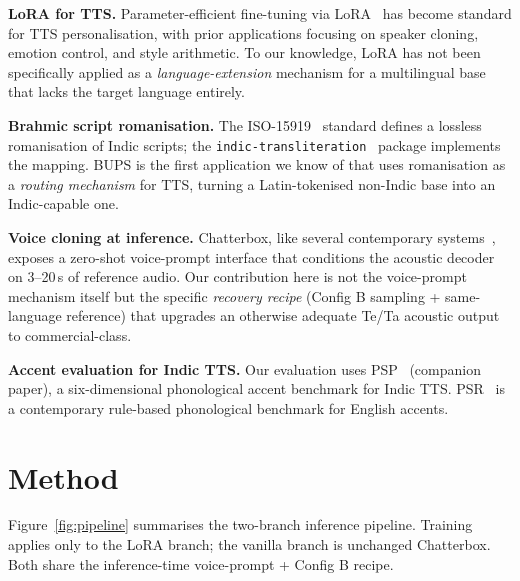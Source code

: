 \documentclass[conference,a4paper]{IEEEtran}
\newcommand{\psp}{\textsc{PSP}}
\newcommand{\bups}{\textsc{BUPS}}
\newcommand{\configb}{Config B}
\begin{document}
\textbf{LoRA for TTS.} Parameter-efficient fine-tuning via LoRA~\cite{hu2021lora} has become standard for TTS personalisation, with prior applications focusing on speaker cloning, emotion control, and style arithmetic. To our knowledge, LoRA has not been specifically applied as a \emph{language-extension} mechanism for a multilingual base that lacks the target language entirely.

\textbf{Brahmic script romanisation.} The ISO-15919~\cite{iso15919} standard defines a lossless romanisation of Indic scripts; the \texttt{indic-transliteration}~\cite{indictransliteration} package implements the mapping. \bups{} is the first application we know of that uses romanisation as a \emph{routing mechanism} for TTS, turning a Latin-tokenised non-Indic base into an Indic-capable one.

\textbf{Voice cloning at inference.} Chatterbox, like several contemporary systems~\cite{f5tts2024,voxcpm2}, exposes a zero-shot voice-prompt interface that conditions the acoustic decoder on 3--20\,s of reference audio. Our contribution here is not the voice-prompt mechanism itself but the specific \emph{recovery recipe} (\configb{} sampling + same-language reference) that upgrades an otherwise adequate Te/Ta acoustic output to commercial-class.

\textbf{Accent evaluation for Indic TTS.} Our evaluation uses \psp{}~\cite{psp2026} (companion paper), a six-dimensional phonological accent benchmark for Indic TTS. PSR~\cite{psr2026} is a contemporary rule-based phonological benchmark for English accents.

\section{Method}
\label{sec:method}

Figure~\ref{fig:pipeline} summarises the two-branch inference pipeline. Training applies only to the LoRA branch; the vanilla branch is unchanged Chatterbox. Both share the inference-time voice-prompt + \configb{} recipe.
\end{document}
